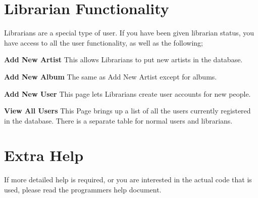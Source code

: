 \documentclass{article}
\begin{document}
\section{Librarian Functionality}
Librarians are a special type of user. If you have been given librarian status, you have access to all the user functionality, as well as the following;
\begin{description}
\item{\bf{Add New Artist}}
This allows Librarians to put new artists in the database.
\item{\bf{Add New Album}}
The same as Add New Artist except for albums.
\item{\bf{Add New User}}
This page lets Librarians create user accounts for new people.
\item{\bf{View All Users}}
This Page brings up a list of all the users currently registered in the database. There is a separate table for normal users and librarians.
\end{description}
\section{Extra Help}
If more detailed help is required, or you are interested in the actual code that is used, please read the programmers help document.
\end{document}
